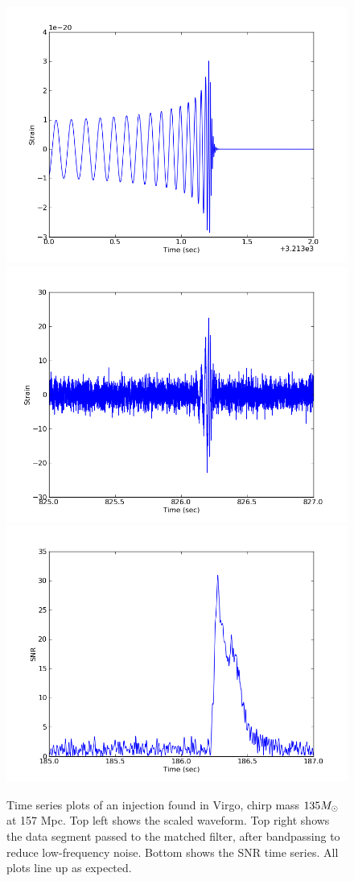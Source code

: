 \begin{figure}
  \includegraphics[width=0.5\linewidth]{figures/ninja2_results/signal}
  \includegraphics[width=0.5\linewidth]{figures/ninja2_results/filtered}
  \includegraphics[width=\linewidth]{figures/ninja2_results/snr}
  \caption[Time series of an distant injection found in V1]{
  \label{f:anomaly_time_series}
Time series plots of an injection found in Virgo,  chirp mass $135
M_\odot$ at 157 Mpc.  Top left shows the scaled waveform.  Top right
shows the data segment passed to the matched filter,
after bandpassing to reduce low-frequency noise.  Bottom shows the SNR
time series.  All plots line up as expected.
}
\end{figure}%


